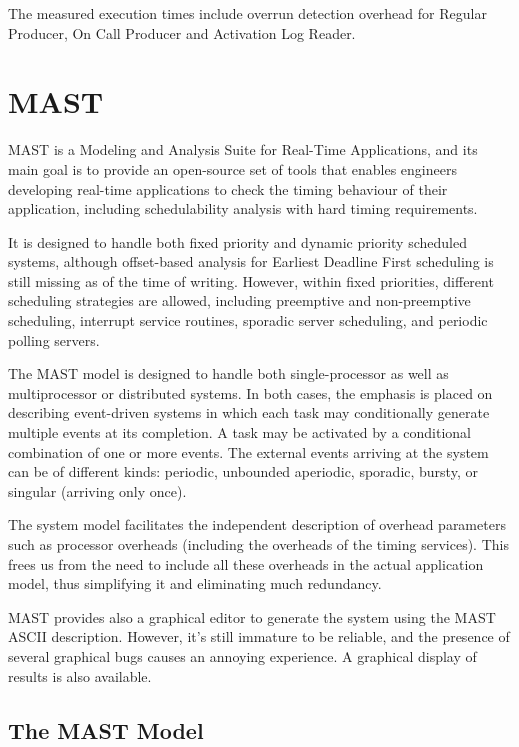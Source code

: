 \documentclass{article}
\begin{document}
The measured execution times include overrun detection overhead for Regular Producer, On Call Producer and Activation Log Reader.

\section{MAST}

MAST \cite{mast} is a Modeling and Analysis Suite for Real-Time Applications, and its main goal is to provide an open-source set of tools that enables engineers developing real-time applications to check the timing behaviour of their application, including schedulability analysis with hard timing requirements.

It is designed to handle both fixed priority and dynamic priority scheduled systems, although offset-based analysis for Earliest Deadline First scheduling is still missing as of the time of writing. However, within fixed priorities, different scheduling strategies are allowed, including preemptive and non-preemptive scheduling, interrupt service routines, sporadic server scheduling, and periodic polling servers.

The MAST model is designed to handle both single-processor as well as multiprocessor or distributed systems. In both cases, the emphasis is placed on describing event-driven systems in which each task may conditionally generate multiple events at its completion. A task may be activated by a conditional combination of one or more events. The external events arriving at the system can be of different kinds: periodic, unbounded aperiodic, sporadic, bursty, or singular (arriving only once).

The system model facilitates the independent description of overhead parameters such as processor overheads (including the overheads of the timing services). This frees us from the need to include all these overheads in the actual application model, thus simplifying it and eliminating much redundancy.

MAST provides also a graphical editor to generate the system using the MAST ASCII description. However, it's still immature to be reliable, and the presence of several graphical bugs causes an annoying experience. A graphical display of results is also available.

\subsection{The MAST Model}
\end{document}
